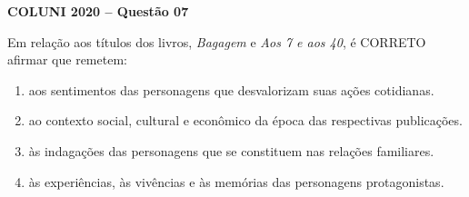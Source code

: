 \textbf{COLUNI 2020 -- Questão 07}\par\medskip Em relação aos títulos dos livros, \textit{Bagagem} e \textit{Aos 7 e aos 40}, é CORRETO afirmar que remetem:\begin{enumerate}
\item aos sentimentos das personagens que desvalorizam suas ações cotidianas.
\item ao contexto social, cultural e econômico da época das respectivas publicações.
\item às indagações das personagens que se constituem nas relações familiares.
\item às experiências, às vivências e às memórias das personagens protagonistas.\end{enumerate}
